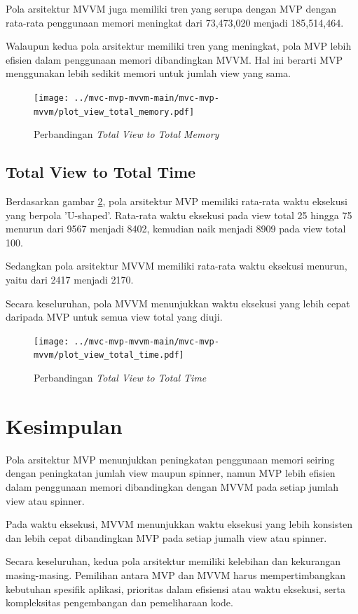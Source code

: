 \documentclass[conference]{IEEEtran}
\begin{document}
	Pola arsitektur MVVM juga memiliki tren yang serupa dengan MVP dengan rata-rata penggunaan memori meningkat dari 73,473,020 menjadi 185,514,464. 
	
	Walaupun kedua pola arsitektur memiliki tren yang meningkat, pola MVP lebih efisien dalam penggunaan memori dibandingkan MVVM. Hal ini berarti MVP menggunakan lebih sedikit memori untuk jumlah view yang sama.
	
	\begin{figure}[h]
		\centering
		\texttt{[image: ../mvc-mvp-mvvm-main/mvc-mvp-mvvm/plot\_view\_total\_memory.pdf]}
		\caption{Perbandingan \textit{Total View to Total Memory}}
		\label{fig:total_view_to_total_memory}
	\end{figure}
	
	\subsection{Total View to Total Time}
	Berdasarkan gambar \ref{fig:total_view_to_total_time}, pola arsitektur MVP memiliki rata-rata waktu eksekusi yang berpola 'U-shaped'. Rata-rata waktu eksekusi pada view total 25 hingga 75 menurun dari 9567 menjadi 8402, kemudian naik menjadi 8909 pada view total 100.
	
	Sedangkan pola arsitektur MVVM memiliki rata-rata waktu eksekusi menurun, yaitu dari 2417 menjadi 2170.
	
	Secara keseluruhan, pola MVVM menunjukkan waktu eksekusi yang lebih cepat daripada MVP untuk semua view total yang diuji.
	
	\vspace{5cm} 
	
	\begin{figure}[h]
		\centering
		\texttt{[image: ../mvc-mvp-mvvm-main/mvc-mvp-mvvm/plot\_view\_total\_time.pdf]}
		\caption{Perbandingan \textit{Total View to Total Time}}
		\label{fig:total_view_to_total_time}
	\end{figure}	
	
	\section{Kesimpulan}
	Pola arsitektur MVP menunjukkan peningkatan penggunaan memori seiring dengan peningkatan jumlah view maupun spinner, namun MVP lebih efisien dalam penggunaan memori dibandingkan dengan MVVM pada setiap jumlah view atau spinner.
	
	Pada waktu eksekusi, MVVM menunjukkan waktu eksekusi yang lebih konsisten dan lebih cepat dibandingkan MVP pada setiap jumalh view atau spinner.
	
	Secara keseluruhan, kedua pola arsitektur memiliki kelebihan dan kekurangan masing-masing. Pemilihan antara MVP dan MVVM harus mempertimbangkan kebutuhan spesifik aplikasi, prioritas dalam efisiensi atau waktu eksekusi, serta kompleksitas pengembangan dan pemeliharaan kode.
	

\end{document}
